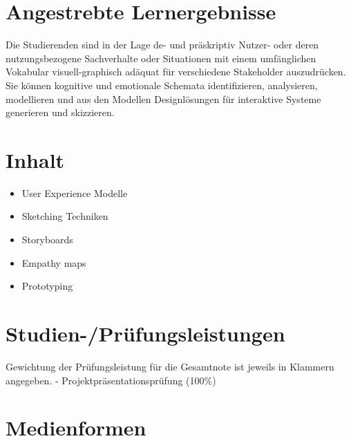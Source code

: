 \section*{Angestrebte
Lernergebnisse\label{/mi-2017/modulbeschreibungen-master/MA_HCI_Sketching_and_Designing_for_User_Experience}}\label{angestrebte-lernergebnissepathlabelmi-2017modulbeschreibungen-mastermaux5fhciux5fsketchingux5fandux5fdesigningux5fforux5fuserux5fexperience}

Die Studierenden sind in der Lage de- und präskriptiv Nutzer- oder deren
nutzungsbezogene Sachverhalte oder Situationen mit einem umfänglichen
Vokabular visuell-graphisch adäquat für verschiedene Stakeholder
auszudrücken. Sie können kognitive und emotionale Schemata
identifizieren, analysieren, modellieren und aus den Modellen
Designlösungen für interaktive Systeme generieren und skizzieren.

\section*{Inhalt\label{/mi-2017/modulbeschreibungen-master/MA_HCI_Sketching_and_Designing_for_User_Experience}}\label{inhaltpathlabelmi-2017modulbeschreibungen-mastermaux5fhciux5fsketchingux5fandux5fdesigningux5fforux5fuserux5fexperience}

\begin{itemize}
\tightlist
\item
  User Experience Modelle
\item
  Sketching Techniken
\item
  Storyboards
\item
  Empathy maps
\item
  Prototyping
\end{itemize}

\section*{Studien-/Prüfungsleistungen\label{/mi-2017/modulbeschreibungen-master/MA_HCI_Sketching_and_Designing_for_User_Experience}}\label{studien-pruxfcfungsleistungenpathlabelmi-2017modulbeschreibungen-mastermaux5fhciux5fsketchingux5fandux5fdesigningux5fforux5fuserux5fexperience}

Gewichtung der Prüfungsleistung für die Gesamtnote ist jeweils in
Klammern angegeben. - Projektpräsentationsprüfung (100\%)

\section*{Medienformen\label{/mi-2017/modulbeschreibungen-master/MA_HCI_Sketching_and_Designing_for_User_Experience}}\label{medienformenpathlabelmi-2017modulbeschreibungen-mastermaux5fhciux5fsketchingux5fandux5fdesigningux5fforux5fuserux5fexperience}

